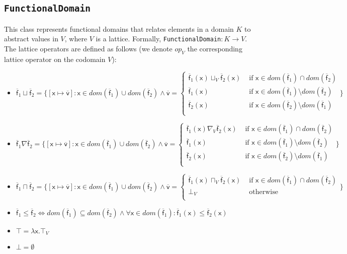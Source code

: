 \documentclass[11pt]{article}
\newcommand{\statement}[1]{\lstinline{#1}}
\newcommand{\cfunction}[1]{\ensuremath{\mathit{#1}}}
\newcommand{\dom}[1]{\ensuremath{\cfunction{dom}(#1)}}
\newcommand{\cel}[1]{\ensuremath{\mathsf{#1}}}
\newcommand{\ael}[1]{\cel{\overline{#1}}}
\begin{document}
\subsection{\statement{FunctionalDomain}}
This class represents functional domains that relates elements in a domain $K$ to abstract values in $V$, where $V$ is a lattice. Formally, \statement{FunctionalDomain}$ : K \to V$. The lattice operators are defined as follows (we denote $\cfunction{op}_V$ the corresponding lattice operator on the codomain $V$):
\begin{itemize}
\item 
$\ael{f}_1 \sqcup \ael{f}_2 = \{[\cel{x} \mapsto \ael{v}] : \cel{x} \in \dom{\ael{f}_1} \cup \dom{\ael{f}_2} \land \ael{v} = \left\{
\begin{array}{ll}
\ael{f}_1(\cel{x}) \sqcup_V \ael{f}_2(\cel{x}) & \textrm{ if } \cel{x} \in \dom{\ael{f}_1} \cap \dom{\ael{f}_2}\\
\ael{f}_1(\cel{x}) & \textrm{ if } \cel{x} \in \dom{\ael{f}_1} \setminus \dom{\ael{f}_2}\\
\ael{f}_2(\cel{x}) & \textrm{ if } \cel{x} \in \dom{\ael{f}_2} \setminus \dom{\ael{f}_1}\\
\end{array}
\right.\}
$
\item 
$\ael{f}_1 \nabla \ael{f}_2 = \{[\cel{x} \mapsto \ael{v}] : \cel{x} \in \dom{\ael{f}_1} \cup \dom{\ael{f}_2} \land \ael{v} = \left\{
\begin{array}{ll}
\ael{f}_1(\cel{x}) \nabla_V \ael{f}_2(\cel{x}) & \textrm{ if } \cel{x} \in \dom{\ael{f}_1} \cap \dom{\ael{f}_2}\\
\ael{f}_1(\cel{x}) & \textrm{ if } \cel{x} \in \dom{\ael{f}_1} \setminus \dom{\ael{f}_2}\\
\ael{f}_2(\cel{x}) & \textrm{ if } \cel{x} \in \dom{\ael{f}_2} \setminus \dom{\ael{f}_1}\\
\end{array}
\right.\}
$
\item 
$\ael{f}_1 \sqcap \ael{f}_2 = \{[\cel{x} \mapsto \ael{v}] : \cel{x} \in \dom{\ael{f}_1} \cup \dom{\ael{f}_2} \land \ael{v} = \left\{
\begin{array}{ll}
\ael{f}_1(\cel{x}) \sqcap_V \ael{f}_2(\cel{x}) & \textrm{ if } \cel{x} \in \dom{\ael{f}_1} \cap \dom{\ael{f}_2}\\
\bot_V & \textrm{ otherwise}\\
\end{array}
\right.\}
$
\item 
$\ael{f}_1 \leq \ael{f}_2 \Leftrightarrow \dom{\ael{f}_1} \subseteq \dom{\ael{f}_2} \land \forall \cel{x} \in \dom{\ael{f}_1} : \ael{f}_1(\cel{x}) \leq \ael{f}_2(\cel{x})$
\item $\top = \lambda \cel{x} . \top_V$
\item $\bot = \emptyset$
\end{itemize}
\end{document}
